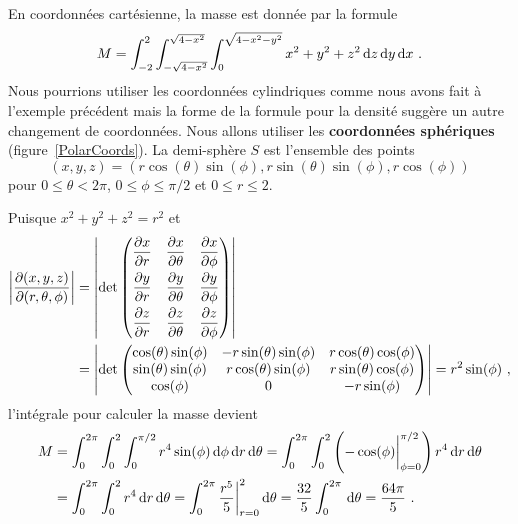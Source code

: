 {\begin{egg}
En coordonnées cartésienne, la masse est donnée par la formule
\[
  M = \int_{-2}^2 \int_{-\sqrt{4-x^2}}^{\sqrt{4-x^2}}
  \int_0^{\sqrt{4-x^2-y^2}} x^2 + y^2 + z^2 \dx{z} \dx{y} \dx{x} \ .
\]
Nous pourrions utiliser les coordonnées cylindriques comme nous avons
fait à l'exemple précédent mais la forme de la formule pour la densité
suggère un autre changement de coordonnées.   Nous allons
utiliser les {\bfseries coordonnées sphériques} (figure~\ref{PolarCoords}).
La demi-sphère $S$ est l'ensemble des points
\[
  (x,y,z) = (r \cos(\theta)\sin(\phi), r\sin(\theta)\sin(\phi),r \cos(\phi))
\]
pour
$0 \leq \theta < 2\pi$, $0 \leq \phi \leq \pi/2$ et $0 \leq r \leq 2$.

Puisque $x^2 + y^2 + z^2 = r^2$ et
\begin{align*}
\left| \frac{\partial(x,y,z)}{\partial(r,\theta,\phi)} \right| &= 
\left| \det \begin{pmatrix}
\displaystyle \frac{\partial x}{\partial r} & \displaystyle \frac{\partial x}{\partial \theta}
& \displaystyle \frac{\partial x}{\partial \phi} \\[0.8em]
\displaystyle \frac{\partial y}{\partial r} & \displaystyle \frac{\partial y}{\partial \theta}
& \displaystyle \frac{\partial y}{\partial \phi} \\[0.8em]
\displaystyle \frac{\partial z}{\partial r} & \displaystyle \frac{\partial z}{\partial \theta}
& \displaystyle \frac{\partial z}{\partial \phi}
\end{pmatrix} \right| \\
&= \left| \det \begin{pmatrix}
\cos(\theta)\sin(\phi) & -r \sin(\theta)\sin(\phi) &
  r\cos(\theta)\cos(\phi) \\
\sin(\theta)\sin(\phi) & r \cos(\theta)\sin(\phi) &
 r\sin(\theta)\cos(\phi) \\
\cos(\phi) & 0 & -r\sin(\phi)
\end{pmatrix} \right|
= r^2 \sin(\phi) \ ,
\end{align*}
l'intégrale pour calculer la masse devient
\begin{align*}
M &= \int_0^{2\pi} \int_0^2 \int_0^{\pi/2}  r^4 \sin(\phi) \,\mathrm{d}\phi
\,\mathrm{d}r \,\mathrm{d}\theta
= \int_0^{2\pi} \int_0^2
\left(-\cos(\phi) \bigg|_{\phi=0}^{\pi/2}\right) r^4 \,\mathrm{d}r \,\mathrm{d}\theta \\
& = \int_0^{2\pi} \int_0^2 r^4 \,\mathrm{d}r \,\mathrm{d}\theta
= \int_0^{2\pi} \frac{r^5}{5}\bigg|_{r=0}^{2} \,\mathrm{d}\theta
= \frac{32}{5} \int_0^{2\pi} \,\mathrm{d}\theta = \frac{64\pi}{5} \ .
\end{align*}
\end{egg}

}  %

